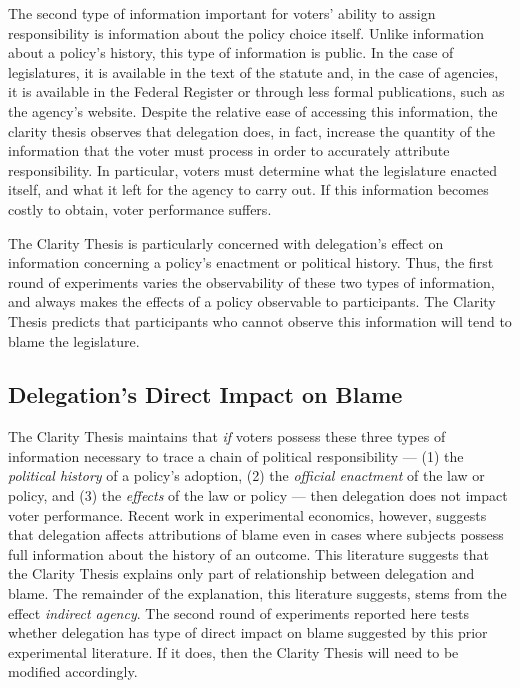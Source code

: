 \documentclass{article}
\begin{document}
The second type of information important for voters' ability to assign responsibility is information about the policy choice itself. Unlike information about a policy's history, this type of information is public. In the case of legislatures, it is available in the text of the statute and, in the case of agencies, it is available in the Federal Register or through less formal publications, such as the agency's website. Despite the relative ease of accessing this information, the clarity thesis observes that delegation does, in fact, increase the quantity of the information that the voter must process in order to accurately attribute responsibility. In particular, voters must determine what the legislature enacted itself, and what it left for the agency to carry out. If this information becomes costly to obtain, voter performance suffers. 

The Clarity Thesis is particularly concerned with delegation's effect on information concerning a policy's enactment or political history. Thus, the first round of experiments varies the observability of these two types of information, and always makes the effects of a policy observable to participants. The Clarity Thesis predicts that participants who cannot observe this information will tend to blame the legislature.

\subsection{Delegation's Direct Impact on Blame}

The Clarity Thesis maintains that \emph{if} voters possess these three types of information necessary to trace a chain of political responsibility --- (1) the \emph{political history} of a policy's adoption, (2) the \emph{official enactment} of the law or policy, and (3) the \emph{effects} of the law or policy --- then delegation does not impact voter performance. Recent work in experimental economics, however, suggests that delegation affects attributions of blame even in cases where subjects possess full information about the history of an outcome. This literature suggests that the Clarity Thesis explains only part of relationship between delegation and blame. The remainder of the explanation, this literature suggests, stems from the effect \emph{indirect agency}. The second round of experiments reported here tests whether delegation has type of direct impact on blame suggested by this prior experimental literature. If it does, then the Clarity Thesis will need to be modified accordingly.
\end{document}
